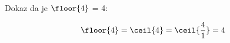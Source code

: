 Dokaz da je $\floor{4}$ = 4:

\begin{equation}
    \floor{4} = \ceil{4} = \ceil{\frac41} = 4
\end{equation}